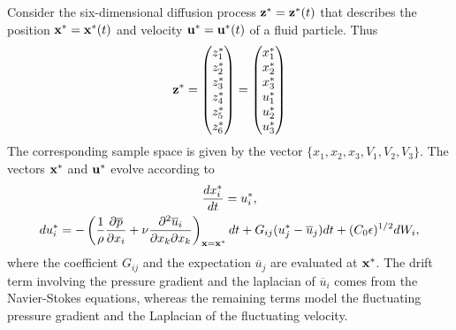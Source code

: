 \documentclass[oneside,a4paper,11pt]{report}
\newcommand{\pavg}{\overline{p}}
\newcommand{\uavg}{\overline{u}}
\begin{document}
Consider the six-dimensional diffusion process $\mathbf{z}^* = \mathbf{z}^*(t)$  that describes the position $\mathbf{x}^* = \mathbf{x}^*(t)$ and velocity $\mathbf{u}^* = \mathbf{u}^*(t)$ of a fluid particle. Thus
\begin{equation}
\mathbf{z}^* = \begin{pmatrix}
  z_1^* \\
  z_2^* \\
  z_3^* \\
  z_4^* \\
  z_5^* \\
  z_6^*
 \end{pmatrix}
=\begin{pmatrix}
  x_1^* \\
  x_2^* \\
  x_3^* \\
  u_1^* \\
  u_2^* \\
  u_3^*
 \end{pmatrix}
\end{equation}
The corresponding sample space is given by the vector $\{x_1, x_2, x_3, V_1, V_2, V_3\}$. The vectors $\mathbf{x}^*$ and $\mathbf{u}^*$ evolve according to
\begin{gather}
\frac{d x^*_i}{dt} = u^*_i, \\
du_i^* = -\left ( \frac{1}{\rho} \frac{\partial \pavg}{\partial x_i} + \nu \frac{\partial^2 \uavg_i}{\partial x_k \partial x_k} \right )_{\xvec = \xvec^*} dt + G_{ij} (u_j^* - \uavg_j) dt + (C_0 \epsilon)^{1/2} dW_i,
\end{gather} 
where the coefficient $G_{ij}$ and the expectation $\uavg_j$ are evaluated at $\mathbf{x}^*$. The drift term involving the pressure gradient and the laplacian of $\uavg_i$ comes from the Navier-Stokes equations, whereas the remaining terms model the fluctuating pressure gradient and the Laplacian of the fluctuating velocity.
\end{document}
